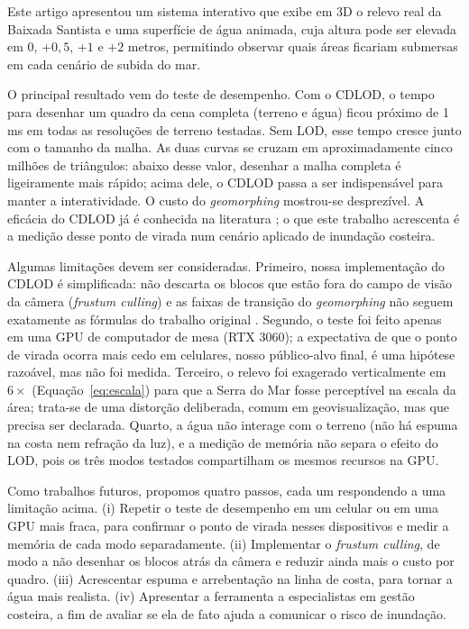 \documentclass[conference]{IEEEtran}
\begin{document}
Este artigo apresentou um sistema interativo que exibe em 3D o relevo
real da Baixada Santista e uma superfície de água animada, cuja altura
pode ser elevada em 0, $+0{,}5$, $+1$ e $+2$ metros, permitindo
observar quais áreas ficariam submersas em cada cenário de subida do
mar.

O principal resultado vem do teste de desempenho. Com o CDLOD, o tempo
para desenhar um quadro da cena completa (terreno e água) ficou próximo
de 1 ms em todas as resoluções de terreno testadas. Sem LOD, esse tempo
cresce junto com o tamanho da malha. As duas curvas se cruzam em
aproximadamente cinco milhões de triângulos: abaixo desse valor, desenhar
a malha completa é ligeiramente mais rápido; acima dele, o CDLOD passa a
ser indispensável para manter a interatividade. O custo do
\emph{geomorphing} mostrou-se desprezível. A eficácia do CDLOD já é
conhecida na literatura \cite{strugar2009}; o que este trabalho
acrescenta é a medição desse ponto de virada num cenário aplicado de
inundação costeira.

Algumas limitações devem ser consideradas. Primeiro, nossa implementação
do CDLOD é simplificada: não descarta os blocos que estão fora do campo
de visão da câmera (\emph{frustum culling}) e as faixas de transição do
\emph{geomorphing} não seguem exatamente as fórmulas do trabalho original
\cite{strugar2009}. Segundo, o teste foi feito apenas em uma GPU de
computador de mesa (RTX 3060); a expectativa de que o ponto de virada
ocorra mais cedo em celulares, nosso público-alvo final, é uma hipótese
razoável, mas não foi medida. Terceiro, o relevo foi exagerado
verticalmente em $6\times$ (Equação~\eqref{eq:escala}) para que a Serra
do Mar fosse perceptível na escala da área; trata-se de uma distorção
deliberada, comum em geovisualização, mas que precisa ser declarada.
Quarto, a água não interage com o terreno (não há espuma na costa nem
refração da luz), e a medição de memória não separa o efeito do LOD,
pois os três modos testados compartilham os mesmos recursos na GPU.

Como trabalhos futuros, propomos quatro passos, cada um respondendo a
uma limitação acima. (i) Repetir o teste de desempenho em um celular ou
em uma GPU mais fraca, para confirmar o ponto de virada nesses
dispositivos e medir a memória de cada modo separadamente. (ii)
Implementar o \emph{frustum culling}, de modo a não desenhar os blocos
atrás da câmera e reduzir ainda mais o custo por quadro. (iii) Acrescentar
espuma e arrebentação na linha de costa, para tornar a água mais
realista. (iv) Apresentar a ferramenta a especialistas em gestão
costeira, a fim de avaliar se ela de fato ajuda a comunicar o risco de
inundação.
\end{document}
